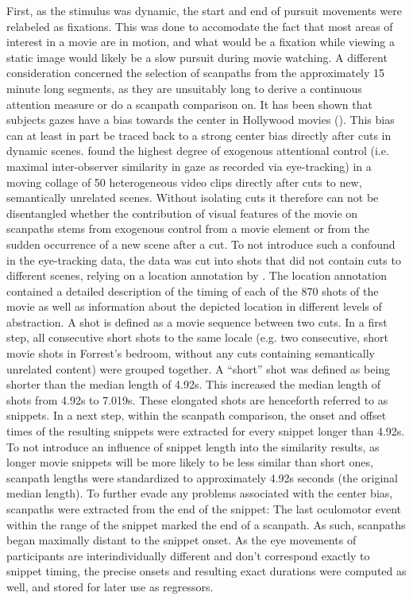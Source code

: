 \documentclass[a4paper, 12pt]{scrreprt}
\begin{document}
First, as the stimulus was dynamic, the start and end of pursuit movements were relabeled as fixations. This was done to accomodate the fact that most areas of interest in a movie are in motion, and what would be a fixation while viewing a static image would likely be a slow pursuit during movie watching. A different consideration concerned the selection of scanpaths from the approximately 15 minute long segments, as they are unsuitably long to derive a continuous attention measure or do a scanpath comparison on. It has been shown that subjects gazes have a bias towards the center in Hollywood movies (\cite{tseng2009quantifying}). This bias can at least in part be traced back to a strong center bias directly after cuts in dynamic scenes. \textcite{carmi2006visual} found the highest degree of exogenous attentional control (i.e. maximal inter-observer similarity in gaze as recorded via eye-tracking) in a moving collage of 50 heterogeneous video clips directly after cuts to new, semantically unrelated scenes. Without isolating cuts it therefore can not be disentangled whether the contribution of visual features of the movie on scanpaths stems from exogenous control from a movie element or from the sudden occurrence of a new scene after a cut. To not introduce such a confound in the eye-tracking data, the data was cut into shots that did not contain cuts to different scenes, relying on a location annotation by \textcite{hausler2016annotation}. The location annotation contained a detailed description of the timing of each of the 870 shots of the movie as well as information about the depicted location in different levels of abstraction. A shot is defined as a movie sequence between two cuts. In a first step, all consecutive short shots to the same locale (e.g. two consecutive, short movie shots in Forrest's bedroom, without any cuts containing semantically unrelated content) were grouped together. A “short” shot was defined as being shorter than the median length of 4.92s. This increased the median length of shots from 4.92s to 7.019s. These elongated shots are henceforth referred to as snippets. In a next step, within the scanpath comparison, the onset and offset times of the resulting snippets were extracted for every snippet longer than 4.92s. To not introduce an influence of snippet length into the similarity results, as longer movie snippets will be more likely to be less similar than short ones, scanpath lengths were standardized to approximately 4.92s seconds (the original median length). To further evade any problems associated with the center bias, scanpaths were extracted from the end of the snippet: The last oculomotor event within the range of the snippet marked the end of a scanpath. As such, scanpaths began maximally distant to the snippet onset.
As the eye movements of participants are interindividually different and don't correspond exactly to snippet timing, the precise onsets and resulting exact durations were computed as well, and stored for later use as regressors.
\end{document}
